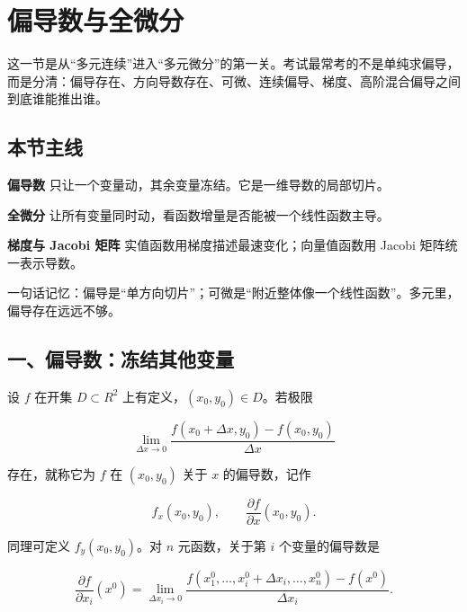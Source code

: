\section{偏导数与全微分}

这一节是从“多元连续”进入“多元微分”的第一关。考试最常考的不是单纯求偏导，而是分清：偏导存在、方向导数存在、可微、连续偏导、梯度、高阶混合偏导之间到底谁能推出谁。

\subsection*{本节主线}

\begin{conceptbox}
\textbf{偏导数}
只让一个变量动，其余变量冻结。它是一维导数的局部切片。
\end{conceptbox}

\begin{conceptbox}
\textbf{全微分}
让所有变量同时动，看函数增量是否能被一个线性函数主导。
\end{conceptbox}

\begin{conceptbox}
\textbf{梯度与 Jacobi 矩阵}
实值函数用梯度描述最速变化；向量值函数用 Jacobi 矩阵统一表示导数。
\end{conceptbox}

\begin{notebox}
一句话记忆：偏导是“单方向切片”；可微是“附近整体像一个线性函数”。多元里，偏导存在远远不够。
\end{notebox}

\subsection*{一、偏导数：冻结其他变量}

设 \(f\) 在开集 \(D\subset R^2\) 上有定义，\((x_0,y_0)\in D\)。若极限

\[
      \lim_{\Delta x\to0}
      \frac{f(x_0+\Delta x,y_0)-f(x_0,y_0)}{\Delta x}
    \]

存在，就称它为 \(f\) 在 \((x_0,y_0)\) 关于 \(x\) 的偏导数，记作

\[
      f_x(x_0,y_0),\qquad \frac{\partial f}{\partial x}(x_0,y_0).
    \]

同理可定义 \(f_y(x_0,y_0)\)。对 \(n\) 元函数，关于第 \(i\) 个变量的偏导数是

\[
      \frac{\partial f}{\partial x_i}(x^0)=
      \lim_{\Delta x_i\to0}
      \frac{f(x_1^0,\ldots,x_i^0+\Delta x_i,\ldots,x_n^0)-f(x^0)}
      {\Delta x_i}.
    \]

